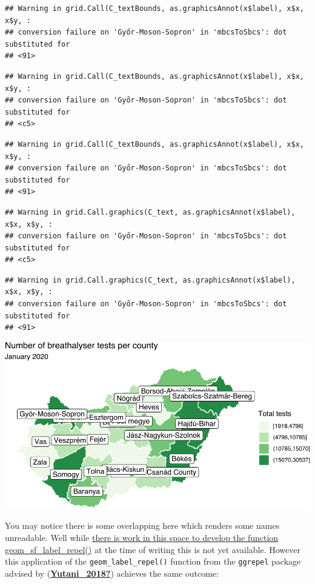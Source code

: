 \documentclass[
]{book}
\begin{document}
\begin{verbatim}
## Warning in grid.Call(C_textBounds, as.graphicsAnnot(x$label), x$x, x$y, :
## conversion failure on 'Győr-Moson-Sopron' in 'mbcsToSbcs': dot substituted for
## <91>
\end{verbatim}

\begin{verbatim}
## Warning in grid.Call(C_textBounds, as.graphicsAnnot(x$label), x$x, x$y, :
## conversion failure on 'Győr-Moson-Sopron' in 'mbcsToSbcs': dot substituted for
## <c5>
\end{verbatim}

\begin{verbatim}
## Warning in grid.Call(C_textBounds, as.graphicsAnnot(x$label), x$x, x$y, :
## conversion failure on 'Győr-Moson-Sopron' in 'mbcsToSbcs': dot substituted for
## <91>
\end{verbatim}

\begin{verbatim}
## Warning in grid.Call.graphics(C_text, as.graphicsAnnot(x$label), x$x, x$y, :
## conversion failure on 'Győr-Moson-Sopron' in 'mbcsToSbcs': dot substituted for
## <c5>
\end{verbatim}

\begin{verbatim}
## Warning in grid.Call.graphics(C_text, as.graphicsAnnot(x$label), x$x, x$y, :
## conversion failure on 'Győr-Moson-Sopron' in 'mbcsToSbcs': dot substituted for
## <91>
\end{verbatim}

\includegraphics{crime_mapping_files/figure-latex/addcountynames-1.pdf}

You may notice there is some overlapping here which renders some names unreadable. Well while \href{https://github.com/slowkow/ggrepel/issues/111}{there is work in this space to develop the function geom\_sf\_label\_repel()} at the time of writing this is not yet available. However this application of the \texttt{geom\_label\_repel()} function from the \texttt{ggrepel} package advised by (\protect\hyperlink{ref-Yutani_2018}{\textbf{Yutani\_2018?}}) achieves the same outcome:
\end{document}
